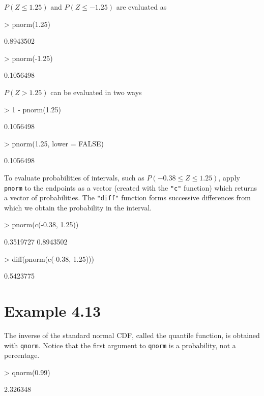 \documentclass{book}
\begin{document}
$P(Z\le 1.25)$ and $P(Z\le-1.25)$ are evaluated as
\begin{Schunk}
\begin{Sinput}
> pnorm(1.25)
\end{Sinput}
\begin{Soutput}
[1] 0.8943502
\end{Soutput}
\begin{Sinput}
> pnorm(-1.25)
\end{Sinput}
\begin{Soutput}
[1] 0.1056498
\end{Soutput}
\end{Schunk}
$P(Z>1.25)$ can be evaluated in two ways
\begin{Schunk}
\begin{Sinput}
> 1 - pnorm(1.25)
\end{Sinput}
\begin{Soutput}
[1] 0.1056498
\end{Soutput}
\begin{Sinput}
> pnorm(1.25, lower = FALSE)
\end{Sinput}
\begin{Soutput}
[1] 0.1056498
\end{Soutput}
\end{Schunk}
To evaluate probabilities of intervals, such as $P(-0.38\le
Z\le1.25)$, apply \texttt{pnorm} to the endpoints as a vector (created
with the \texttt{"c"} function) which returns a vector of
probabilities.  The \texttt{"diff"} function forms successive
differences from which we obtain the probability in the interval.
\begin{Schunk}
\begin{Sinput}
> pnorm(c(-0.38, 1.25))
\end{Sinput}
\begin{Soutput}
[1] 0.3519727 0.8943502
\end{Soutput}
\begin{Sinput}
> diff(pnorm(c(-0.38, 1.25)))
\end{Sinput}
\begin{Soutput}
[1] 0.5423775
\end{Soutput}
\end{Schunk}


\section{Example 4.13}
\label{sec:xmp0413}

The inverse of the standard normal CDF, called the quantile function,
is obtained with \texttt{qnorm}.  Notice that the first argument to
\texttt{qnorm} is a probability, not a percentage.
\begin{Schunk}
\begin{Sinput}
> qnorm(0.99)
\end{Sinput}
\begin{Soutput}
[1] 2.326348
\end{Soutput}
\end{Schunk}
\end{document}
